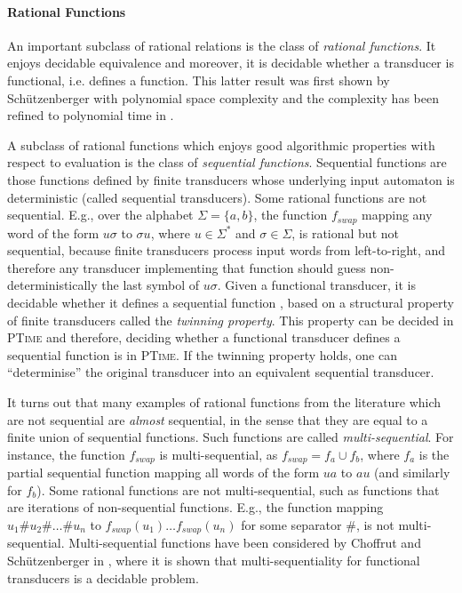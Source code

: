\documentclass[envcountsame]{llncs}
\begin{document}
\paragraph{Rational Functions} An important subclass of rational relations is the class of
\emph{rational functions}.  It enjoys decidable
equivalence and moreover, it is decidable whether a transducer
is functional, i.e. defines a function. This latter result was first shown by 
Sch\"utzenberger with polynomial space complexity \cite{Schutz75} and the complexity has been refined to
polynomial time in \cite{GurIba83,BealCPS03}.


A subclass of rational functions which enjoys good algorithmic
properties with respect to evaluation is the class of \emph{sequential
  functions}. Sequential functions are those functions defined by 
finite transducers whose underlying input automaton is deterministic
(called sequential transducers). Some rational functions are not
sequential. E.g., over the alphabet $\Sigma = \{a,b\}$, the 
function $f_{swap}$ mapping any word of the form $u\sigma$ to $\sigma u$, where
$u\in\Sigma^*$ and $\sigma\in\Sigma$, is rational but not sequential,
because finite transducers process input words from left-to-right, and
therefore any transducer implementing that function should
 guess non-deterministically the last symbol of $u\sigma$. 
Given a functional transducer, it is decidable whether it defines a
sequential function \cite{DBLP:journals/tcs/Choffrut77}, based on a
structural property of finite transducers called the \emph{twinning
  property}. This property can be decided in \textsc{PTime}
\cite{BealCPS03} and therefore, deciding whether a functional
transducer defines a sequential function is in
\textsc{PTime}. If the twinning property holds, one can
``determinise'' the original transducer into an equivalent sequential
transducer. 



It turns out that many examples of rational functions from the
literature which are not sequential are \emph{almost} sequential, in
the sense that they are equal to a finite union of sequential
functions. Such functions are called \emph{multi-sequential}. 
For instance, the function $f_{swap}$ is multi-sequential, as
$f_{swap} = f_a\cup f_b$, where $f_a$ is
the partial sequential function mapping all words of the form $ua$ to
$au$ (and similarly for $f_b$). Some rational functions are not
multi-sequential,  such as functions that are iterations of non-sequential functions. E.g., the function 
mapping $u_1\# u_2\#\dots \# u_n$ to $f_{swap}(u_1)\dots
f_{swap}(u_n)$ for some separator $\#$, is not multi-sequential. 
Multi-sequential functions have been
considered by Choffrut and
Sch\"utzenberger in \cite{DBLP:conf/stacs/ChoffrutS86}, where it is shown
that multi-sequentiality for functional transducers is a decidable
problem. 
\end{document}
